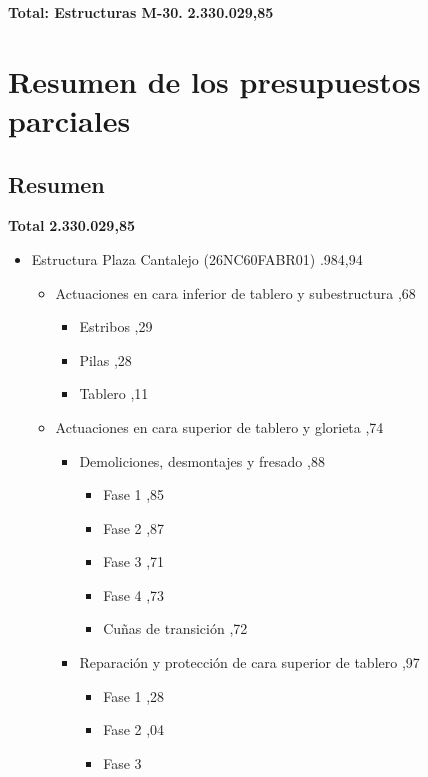 \documentclass{book}%
\begin{document}
%
\noindent%
\large%
\textbf{Total: Estructuras M{-}30. }%
\dotfill%
\textbf{2.330.029,85}%
\newline%
\normalsize

%
\part{Resumen de los presupuestos parciales}%
\label{sec:Resumendelospresupuestosparciales}%
\chapter*{Resumen}%
\label{sec:Resumen}%
\Large%
\textbf{Total}%
\dotfill%
\textbf{2.330.029,85}%
\normalsize%
\begin{itemize}%
\item%
Estructura Plaza Cantalejo (26NC60FABR01)%
.984,94%
\begin{itemize}%
\item%
Actuaciones en cara inferior de tablero y subestructura%
,68%
\begin{itemize}%
\item%
Estribos%
,29%
\item%
Pilas%
,28%
\item%
Tablero%
,11%
\end{itemize}%
\item%
Actuaciones en cara superior de tablero y glorieta%
,74%
\begin{itemize}%
\item%
Demoliciones, desmontajes y fresado%
,88%
\begin{itemize}%
\item%
Fase 1%
,85%
\item%
Fase 2%
,87%
\item%
Fase 3%
,71%
\item%
Fase 4%
,73%
\item%
Cuñas de transición%
,72%
\end{itemize}%
\item%
Reparación y protección de cara superior de tablero%
,97%
\begin{itemize}%
\item%
Fase 1%
,28%
\item%
Fase 2%
,04%
\item%
Fase 3%
\dotfill%

\end{itemize}
\end{itemize}
\end{itemize}
\end{itemize}
\end{document}
